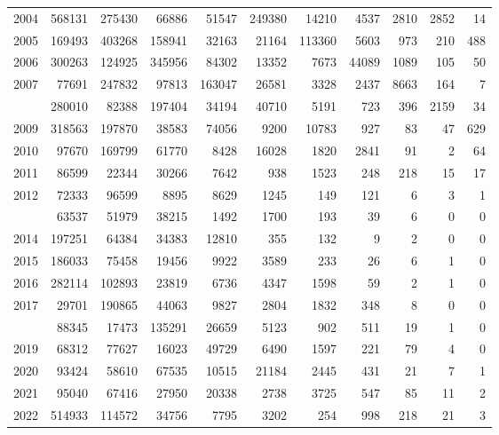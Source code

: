 \documentclass[
]{article}
\begin{document}
\begin{longtable}[t]{lrrrrrrrrrr}
2004 & 568131 & 275430 & 66886 & 51547 & 249380 & 14210 & 4537 & 2810 & 2852 & 14\\
2005 & 169493 & 403268 & 158941 & 32163 & 21164 & 113360 & 5603 & 973 & 210 & 488\\
2006 & 300263 & 124925 & 345956 & 84302 & 13352 & 7673 & 44089 & 1089 & 105 & 50\\
2007 & 77691 & 247832 & 97813 & 163047 & 26581 & 3328 & 2437 & 8663 & 164 & 7\\
\addlinespace
2008 & 280010 & 82388 & 197404 & 34194 & 40710 & 5191 & 723 & 396 & 2159 & 34\\
2009 & 318563 & 197870 & 38583 & 74056 & 9200 & 10783 & 927 & 83 & 47 & 629\\
2010 & 97670 & 169799 & 61770 & 8428 & 16028 & 1820 & 2841 & 91 & 2 & 64\\
2011 & 86599 & 22344 & 30266 & 7642 & 938 & 1523 & 248 & 218 & 15 & 17\\
2012 & 72333 & 96599 & 8895 & 8629 & 1245 & 149 & 121 & 6 & 3 & 1\\
\addlinespace
2013 & 63537 & 51979 & 38215 & 1492 & 1700 & 193 & 39 & 6 & 0 & 0\\
2014 & 197251 & 64384 & 34383 & 12810 & 355 & 132 & 9 & 2 & 0 & 0\\
2015 & 186033 & 75458 & 19456 & 9922 & 3589 & 233 & 26 & 6 & 1 & 0\\
2016 & 282114 & 102893 & 23819 & 6736 & 4347 & 1598 & 59 & 2 & 1 & 0\\
2017 & 29701 & 190865 & 44063 & 9827 & 2804 & 1832 & 348 & 8 & 0 & 0\\
\addlinespace
2018 & 88345 & 17473 & 135291 & 26659 & 5123 & 902 & 511 & 19 & 1 & 0\\
2019 & 68312 & 77627 & 16023 & 49729 & 6490 & 1597 & 221 & 79 & 4 & 0\\
2020 & 93424 & 58610 & 67535 & 10515 & 21184 & 2445 & 431 & 21 & 7 & 1\\
2021 & 95040 & 67416 & 27950 & 20338 & 2738 & 3725 & 547 & 85 & 11 & 2\\
2022 & 514933 & 114572 & 34756 & 7795 & 3202 & 254 & 998 & 218 & 21 & 3\\*
\end{longtable}
\end{document}
